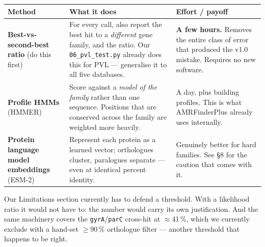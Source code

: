 \begin{center}\small
\begin{tabular}{@{}>{\raggedright\arraybackslash}p{3.7cm}>{\raggedright\arraybackslash}p{6.2cm}>{\raggedright\arraybackslash}p{6.2cm}@{}}
\toprule
\rowcolor{quantum!13}
\textbf{\color{quantum}Method} & \textbf{\color{quantum}What it does} & \textbf{\color{quantum}Effort / payoff}\\
\midrule
\textbf{Best-vs-second-best ratio} \newline (do this first) &
 For every call, also report the best hit to a \emph{different} gene family, and the ratio. Our
 \texttt{06\_pvl\_test.py} already does this for PVL --- generalise it to all five databases. &
 \textbf{A few hours.} Removes the entire class of error that produced the v1.0 mistake. Requires no
 new software.\\
\textbf{Profile HMMs} \newline (HMMER) &
 Score against a \emph{model of the family} rather than one sequence. Positions that are conserved
 across the family are weighted more heavily. &
 A day, plus building profiles. This is what AMRFinderPlus already uses internally.\\
\textbf{Protein language model embeddings} \newline (ESM-2) &
 Represent each protein as a learned vector; orthologues cluster, paralogues separate --- even at
 identical percent identity. &
 Genuinely better for hard families. See \S8 for the caution that comes with it.\\
\bottomrule
\end{tabular}
\end{center}

\begin{dobox}[title={Why this matters beyond one gene}]
Our Limitations section currently has to defend a threshold. With a likelihood ratio it would not
have to: the number would carry its own justification. And the same machinery covers the
\texttt{gyrA}/\texttt{parC} cross-hit at $\approx$41\,\%, which we currently exclude with a hand-set
$\ge$90\,\% orthologue filter --- another threshold that happens to be right.
\end{dobox}
